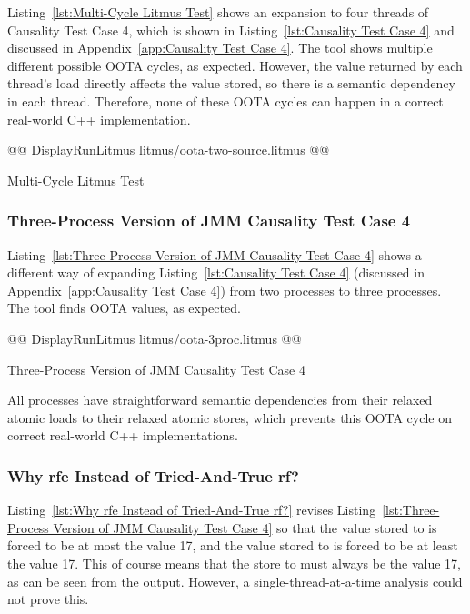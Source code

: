 \documentclass[10]{article}
\begin{document}
Listing~\ref{lst:Multi-Cycle Litmus Test}
shows an expansion to four threads of Causality Test Case 4, which is shown in
Listing~\ref{lst:Causality Test Case 4}
and discussed in
Appendix~\ref{app:Causality Test Case 4}.
The  tool shows multiple different possible OOTA cycles,
as expected.
However, the value returned by each thread's load directly affects the
value stored, so there is a semantic dependency in each thread.
Therefore, none of these OOTA cycles can happen in a correct real-world
C++ implementation.

\begin{listing}[tbp]
@@ DisplayRunLitmus litmus/oota-two-source.litmus @@
\caption{Multi-Cycle Litmus Test}
\label{lst:Multi-Cycle Litmus Test}
\end{listing}

\subsubsection{Three-Process Version of JMM Causality Test Case 4}
\label{app:Three-Process Version of JMM Causality Test Case 4}

Listing~\ref{lst:Three-Process Version of JMM Causality Test Case 4}
shows a different way of expanding
Listing~\ref{lst:Causality Test Case 4}
(discussed in
Appendix~\ref{app:Causality Test Case 4})
from two processes to three processes.
The  tool finds OOTA values, as expected.

\begin{listing}[tbp]
@@ DisplayRunLitmus litmus/oota-3proc.litmus @@
\caption{Three-Process Version of JMM Causality Test Case 4}
\label{lst:Three-Process Version of JMM Causality Test Case 4}
\end{listing}

All processes have straightforward semantic dependencies from their
relaxed atomic loads to their relaxed atomic stores, which prevents this
OOTA cycle on correct real-world C++ implementations.

\subsubsection{Why rfe Instead of Tried-And-True rf?}
\label{app:Why rfe Instead of Tried-And-True rf?}

Listing~\ref{lst:Why rfe Instead of Tried-And-True rf?}
revises
Listing~\ref{lst:Three-Process Version of JMM Causality Test Case 4}
so that the value stored to  is forced to be at most the
value 17, and the value stored to  is forced to be at least the
value 17.
This of course means that the store to  must always be the value
17, as can be seen from the  output.
However, a single-thread-at-a-time analysis could not prove this.
\end{document}
